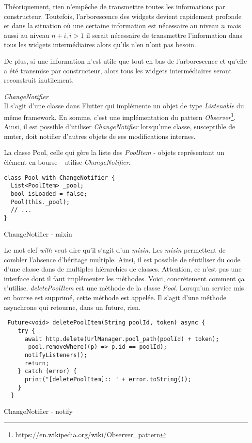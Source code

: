 Théoriquement, rien n'empêche de transmettre toutes les informations par constructeur. Toutefois, l'arborescence des widgets devient rapidement profonde
et dans la situation où une certaine information est nécessaire au niveau \(n\) mais aussi au niveau \(n+i, i > 1\) il serait nécessaire de transmettre l'information
dans tous les widgets intermédiaires alors qu'ils n'en n'ont pas besoin.

De plus, si une information n'est utile que tout en bas de l'arborescence et qu'elle a été transmise par constructeur, alors tous les widgets intermédiaires seront reconstruit inutilement.

\emph{ChangeNotifier}\\
Il s'agit d'une classe dans Flutter qui implémente un objet de type \textit{Listenable} du même framework. En somme, c'est une implémentation du pattern \textit{Observer}\footnote{https://en.wikipedia.org/wiki/Observer\_pattern}. Ainsi, il est possible d'utiliser \textit{ChangeNotifier} lorsqu'une classe, susceptible de muter, doit notifier d'autres objets de ses modifications internes. 

La classe Pool, celle qui gère la liste des \textit{PoolItem} - objets représentant un élément en bourse - utilise \textit{ChangeNotifier}.
\begin{listing}[!h]
    \begin{verbatim}
class Pool with ChangeNotifier {
  List<PoolItem> _pool;
  bool isLoaded = false;
  Pool(this._pool);
  // ...
}
\end{verbatim}
\caption{ChangeNotifier - mixin}
\label{code:changeNotifier}
\end{listing}

Le mot clef \textit{with} veut dire qu'il s'agit d'un \textit{mixin}. Les \textit{mixin} permettent de combler l'absence d'héritage multiple. Ainsi, il est possible de réutiliser du code d'une classe dans de multiples hiérarchies de classes. Attention, ce n'est pas une interface dont il faut implémenter les méthodes.
\newpage
Voici, concrètement comment ça s'utilise. \textit{deletePoolItem} est une méthode de la classe \textit{Pool}. Lorsqu'un service mis en bourse est supprimé, cette méthode est appelée. Il s'agit d'une méthode asynchrone qui retourne, dans un future, rien.

\begin{listing}[!h]
\begin{verbatim}
 Future<void> deletePoolItem(String poolId, token) async {
    try {
      await http.delete(UrlManager.pool_path(poolId) + token);
      _pool.removeWhere((p) => p.id == poolId);
      notifyListeners();
      return;
    } catch (error) {
      print("[deletePoolItem]:: " + error.toString());
    }
  }
\end{verbatim}
\caption{ChangeNotifier - notify}
\label{code:changeNotifierNotify}
\end{listing}

